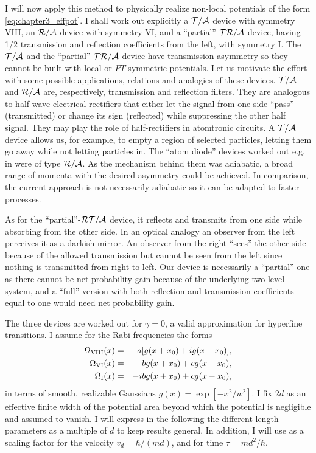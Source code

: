 I will now apply this method to physically realize non-local potentials of the form \eqref{eq:chapter3_effpot}. I shall work out explicitly a ${\cal T/A}$ device with symmetry  VIII, an ${\cal R/A}$ device with symmetry  VI, and a ``partial''-${\cal TR/A}$ device,  having 1/2 transmission and reflection coefficients from the left, with symmetry I. The  ${\cal T/A}$ and the ``partial''-${\cal TR/A}$ device have transmission asymmetry so they cannot be built with local or $PT$-symmetric  potentials.
Let us  motivate the effort with some possible applications, relations  and analogies of these devices.
${\cal T/A}$ and ${\cal R/A}$ are, respectively, transmission and reflection filters. They are analogous to
half-wave electrical rectifiers that either let the signal from one side ``pass'' (transmitted) or change its sign (reflected)
while suppressing the other half signal.  They may play the role of half-rectifiers in atomtronic circuits.
A ${\cal T/A}$ device allows us, for example, to empty a region of selected particles, letting them go away while not letting particles in.
The ``atom diode'' devices worked out e.g. in \cite{Ruschhaupt2004,Ruschhaupt2006a,Ruschhaupt2006,Ruschhaupt2007}
were of type ${\cal R/A}$. As the mechanism behind them was adiabatic, a broad range of momenta with the desired asymmetry
could be achieved. In comparison, the current approach is not necessarily adiabatic so it can be adapted to faster processes.

As for the ``partial''-${\cal RT/A}$ device,  it reflects and transmits from one side while absorbing from the
other side. In an optical analogy an observer from the left perceives it as a darkish mirror.
An observer from the right ``sees'' the other side because of the allowed transmission
but cannot be seen from the left since  nothing is transmitted from right to left. Our device is necessarily a ``partial'' one as
there cannot be  net probability gain because of the underlying two-level system, and a ``full'' version with both reflection and transmission coefficients equal to one
would need net probability gain.

The three devices are worked out for $\gamma=0$, a valid approximation for  hyperfine transitions. %
I assume for the Rabi frequencies the forms
%
\begin{eqnarray}
  \Omega_{\rm VIII} (x) &=& a [g(x+x_0) + i  g(x-x_0)],
  \nonumber\\
  \Omega_{\rm VI} (x) &=&  b g(x+x_0) + c g(x-x_0),
  \nonumber\\
  \Omega_{\rm I} (x) &=&  - i b g(x+x_0) + c g(x-x_0),
  \label{3omegas}
\end{eqnarray}
%
in terms of smooth, realizable Gaussians $g(x) =  \exp[-{x^2}/{w^2}]$.
I fix $2 d$ as an effective finite width
of the potential area beyond which the potential is negligible and assumed to vanish. I will express in the following the different length parameters as a multiple of $d$ to keep results general.
In addition, I will use as a scaling factor for the velocity $v_{d} = {\hbar}/({m d})$, and for time $\tau={m d^2}/{\hbar}$.

